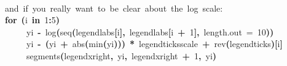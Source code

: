 \documentclass[a4paper]{article}
\newcommand{\hlnumber}[1]{\textcolor[rgb]{0.0823529411764706,0.0784313725490196,0.709803921568627}{#1}}%
\newcommand{\hlfunctioncall}[1]{\textcolor[rgb]{1,0,0}{#1}}%
\newcommand{\hlkeyword}[1]{\textcolor[rgb]{0,0,0}{\textbf{#1}}}%
\newcommand{\hlargument}[1]{\textcolor[rgb]{0.694117647058824,0.247058823529412,0.0196078431372549}{#1}}%
\newcommand{\hlcomment}[1]{\textcolor[rgb]{0.8,0.8,0.8}{#1}}%
\newcommand{\hlassignement}[1]{\textcolor[rgb]{0.215686274509804,0.215686274509804,0.384313725490196}{\textbf{#1}}}%
\newcommand{\hlsymbol}[1]{\textcolor[rgb]{0,0,0}{#1}}%
\newcommand{\hlprompt}[1]{\textcolor[rgb]{0,0,0}{#1}}%
\newcommand{\hlstd}[1]{\textcolor[rgb]{0,0,0}{#1}}%
\newenvironment{Houtput}{\raggedright}{%
%
}
\begin{document}
\begin{Houtput}
\hspace*{\fill}\\
\hlstd{}\ttfamily\noindent
\hlprompt{\usebox{\hlnormalsizeboxgreaterthan}{\ }}\hlcomment{\usebox{\hlnormalsizeboxhash}{\ }and{\ }if{\ }you{\ }really{\ }want{\ }to{\ }be{\ }clear{\ }about{\ }the{\ }log{\ }scale:}\mbox{}
\normalfont
\hspace*{\fill}\\
\hlstd{}\ttfamily\noindent
\hlprompt{\usebox{\hlnormalsizeboxgreaterthan}{\ }}\hlkeyword{for}{\ }\hlkeyword{(}\hlsymbol{i}{\ }\hlkeyword{in}{\ }\hlnumber{1}\hlkeyword{:}\hlnumber{5}\hlkeyword{)}{\ }\hlkeyword{\usebox{\hlnormalsizeboxopenbrace}}\hspace*{\fill}\\
\hlstd{}\hlprompt{{\ }}{\ }{\ }{\ }{\ }\hlsymbol{yi}{\ }\hlassignement{\usebox{\hlnormalsizeboxlessthan}-}{\ }\hlfunctioncall{log}\hlkeyword{(}\hlfunctioncall{seq}\hlkeyword{(}\hlsymbol{legendlabs}\hlkeyword{[}\hlsymbol{i}\hlkeyword{]}\hlkeyword{,}{\ }\hlsymbol{legendlabs}\hlkeyword{[}\hlsymbol{i}{\ }\hlkeyword{+}{\ }\hlnumber{1}\hlkeyword{]}\hlkeyword{,}{\ }\hlargument{length.out}{\ }\hlargument{=}{\ }\hlnumber{10}\hlkeyword{)}\hlkeyword{)}\hspace*{\fill}\\
\hlstd{}\hlprompt{{\ }}{\ }{\ }{\ }{\ }\hlsymbol{yi}{\ }\hlassignement{\usebox{\hlnormalsizeboxlessthan}-}{\ }\hlkeyword{(}\hlsymbol{yi}{\ }\hlkeyword{+}{\ }\hlfunctioncall{abs}\hlkeyword{(}\hlfunctioncall{min}\hlkeyword{(}\hlsymbol{yi}\hlkeyword{)}\hlkeyword{)}\hlkeyword{)}{\ }\hlkeyword{*}{\ }\hlsymbol{legendticksscale}{\ }\hlkeyword{+}{\ }\hlfunctioncall{rev}\hlkeyword{(}\hlsymbol{legendticks}\hlkeyword{)}\hlkeyword{[}\hlsymbol{i}\hlkeyword{]}\hspace*{\fill}\\
\hlstd{}\hlprompt{{\ }}{\ }{\ }{\ }{\ }\hlfunctioncall{segments}\hlkeyword{(}\hlsymbol{legendxright}\hlkeyword{,}{\ }\hlsymbol{yi}\hlkeyword{,}{\ }\hlsymbol{legendxright}{\ }\hlkeyword{+}{\ }\hlnumber{1}\hlkeyword{,}{\ }\hlsymbol{yi}\hlkeyword{)}\hspace*{\fill}\\
\hlstd{}\hlprompt{{\ }}\hlkeyword{\usebox{\hlnormalsizeboxclosebrace}}\mbox{}
\normalfont
\hspace*{\fill}\\
\hlstd{}
\end{Houtput}
\end{document}
